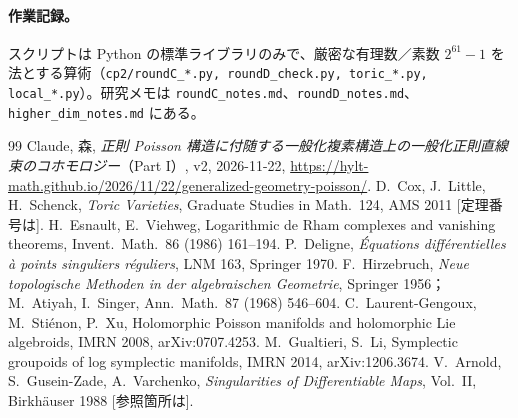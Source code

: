 \paragraph{作業記録。}スクリプトは Python の標準ライブラリのみで、厳密な有理数／素数 $2^{61}-1$ を法とする算術（\texttt{cp2/roundC\_*.py, roundD\_check.py, toric\_*.py, local\_*.py}）。研究メモは \texttt{roundC\_notes.md}、\texttt{roundD\_notes.md}、\texttt{higher\_dim\_notes.md} にある。

\begin{thebibliography}{99}\small
{} Claude, 森, \emph{正則 Poisson 構造に付随する一般化複素構造上の一般化正則直線束のコホモロジー}（Part I）, v2, 2026-11-22, \url{https://hylt-math.github.io/2026/11/22/generalized-geometry-poisson/}.
 D.\ Cox, J.\ Little, H.\ Schenck, \emph{Toric Varieties}, Graduate Studies in Math.\ 124, AMS 2011 [定理番号は\tQ].
 H.\ Esnault, E.\ Viehweg, Logarithmic de Rham complexes and vanishing theorems, Invent.\ Math.\ 86 (1986) 161--194.
 P.\ Deligne, \emph{\'Equations diff\'erentielles \`a points singuliers r\'eguliers}, LNM 163, Springer 1970.
 F.\ Hirzebruch, \emph{Neue topologische Methoden in der algebraischen Geometrie}, Springer 1956；M.\ Atiyah, I.\ Singer, Ann.\ Math.\ 87 (1968) 546--604.
 C.\ Laurent-Gengoux, M.\ Sti\'enon, P.\ Xu, Holomorphic Poisson manifolds and holomorphic Lie algebroids, IMRN 2008, arXiv:0707.4253.
 M.\ Gualtieri, S.\ Li, Symplectic groupoids of log symplectic manifolds, IMRN 2014, arXiv:1206.3674.
 V.\ Arnold, S.\ Gusein-Zade, A.\ Varchenko, \emph{Singularities of Differentiable Maps}, Vol.\ II, Birkh\"auser 1988 [参照箇所は\tQ].
\end{thebibliography}
